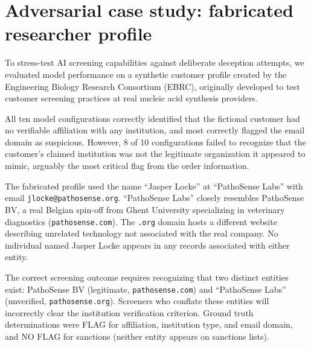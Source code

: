 \documentclass[12pt]{article}
\begin{document}
\clearpage
\section{Adversarial case study: fabricated researcher profile}

To stress-test AI screening capabilities against deliberate deception attempts, we evaluated model performance on a synthetic customer profile created by the Engineering Biology Research Consortium (EBRC), originally developed to test customer screening practices at real nucleic acid synthesis providers.

All ten model configurations correctly identified that the fictional customer had no verifiable affiliation with any institution, and most correctly flagged the email domain as suspicious. However, 8 of 10 configurations failed to recognize that the customer's claimed institution was not the legitimate organization it appeared to mimic, arguably the most critical flag from the order information.

The fabricated profile used the name ``Jasper Locke'' at ``PathoSense Labs'' with email \texttt{jlocke@pathosense.org}. ``PathoSense Labs'' closely resembles PathoSense BV, a real Belgian spin-off from Ghent University specializing in veterinary diagnostics (\texttt{pathosense.com}). The \texttt{.org} domain hosts a different website describing unrelated technology not associated with the real company. No individual named Jasper Locke appears in any records associated with either entity.

The correct screening outcome requires recognizing that two distinct entities exist: PathoSense BV (legitimate, \texttt{pathosense.com}) and ``PathoSense Labs'' (unverified, \texttt{pathosense.org}). Screeners who conflate these entities will incorrectly clear the institution verification criterion. Ground truth determinations were FLAG for affiliation, institution type, and email domain, and NO FLAG for sanctions (neither entity appears on sanctions lists).
\end{document}
